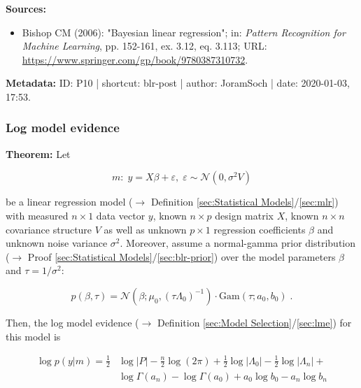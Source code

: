\documentclass[a4paper,12pt,twoside]{book}
\begin{document}
\vspace{1em}
\textbf{Sources:}
\begin{itemize}
\item Bishop CM (2006): "Bayesian linear regression"; in: \textit{Pattern Recognition for Machine Learning}, pp. 152-161, ex. 3.12, eq. 3.113; URL: \url{https://www.springer.com/gp/book/9780387310732}.
\end{itemize}


\vspace{1em}
\textbf{Metadata:} ID: P10 | shortcut: blr-post | author: JoramSoch | date: 2020-01-03, 17:53.
\vspace{1em}



\subsubsection[\textbf{Log model evidence}]{Log model evidence} \label{sec:blr-lme}
\setcounter{equation}{0}

\textbf{Theorem:} Let

\begin{equation} \label{eq:blr-lme-GLM}
m: \; y = X \beta + \varepsilon, \; \varepsilon \sim \mathcal{N}(0, \sigma^2 V)
\end{equation}

be a linear regression model ($\rightarrow$ Definition \ref{sec:Statistical Models}/\ref{sec:mlr}) with measured $n \times 1$ data vector $y$, known $n \times p$ design matrix $X$, known $n \times n$ covariance structure $V$ as well as unknown $p \times 1$ regression coefficients $\beta$ and unknown noise variance $\sigma^2$. Moreover, assume a normal-gamma prior distribution ($\rightarrow$ Proof \ref{sec:Statistical Models}/\ref{sec:blr-prior}) over the model parameters $\beta$ and $\tau = 1/\sigma^2$:

\begin{equation} \label{eq:blr-lme-GLM-NG-prior}
p(\beta,\tau) = \mathcal{N}(\beta; \mu_0, (\tau \Lambda_0)^{-1}) \cdot \mathrm{Gam}(\tau; a_0, b_0) \; .
\end{equation}

Then, the log model evidence ($\rightarrow$ Definition \ref{sec:Model Selection}/\ref{sec:lme}) for this model is

\begin{equation} \label{eq:blr-lme-GLM-NG-LME}
\begin{split}
\log p(y|m) = \frac{1}{2} & \log |P| - \frac{n}{2} \log (2 \pi)  + \frac{1}{2} \log |\Lambda_0| - \frac{1}{2} \log |\Lambda_n| + \\
& \log \Gamma(a_n) - \log \Gamma(a_0) + a_0 \log b_0 - a_n \log b_n
\end{split}
\end{equation}
\end{document}
